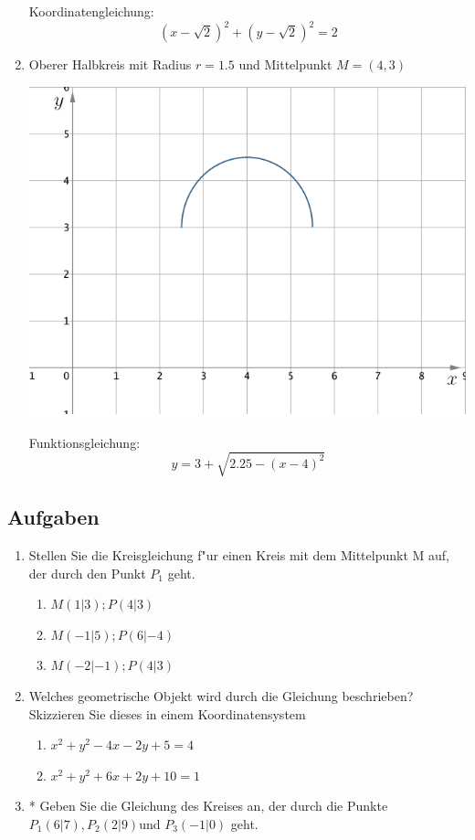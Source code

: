 \begin{enumerate}
Koordinatengleichung:
\[(x - \sqrt 2)^2 + (y - \sqrt 2)^2 = 2 \]


\item Oberer Halbkreis mit Radius $r = 1.5$ und Mittelpunkt $M = (4 , 3)$

\begin{center}
\includegraphics[scale=0.2]{img/kreis/kreis3.png}
\end{center}
Funktionsgleichung: 
\[y = 3 + \sqrt{ 2.25 - (x - 4)^2} \]

\end{enumerate}

\subsection{Aufgaben}
\begin{enumerate}
\item Stellen Sie die Kreisgleichung f"ur einen Kreis mit dem Mittelpunkt M auf, der durch den Punkt $P_1$ geht.
\begin{enumerate}
\item $M(1|3) ; P(4|3)$
\item $M(-1| 5) ; P(6|-4)$
\item $M(-2|-1) ; P(4|3)$
\end{enumerate}
\item Welches geometrische Objekt wird durch die Gleichung beschrieben? Skizzieren Sie dieses in einem Koordinatensystem
\begin{enumerate}
\item $x^2 + y^2 - 4x - 2y + 5 = 4$
\item $x^2 + y^2 + 6x + 2y + 10 = 1$
\end{enumerate}

\item * Geben Sie die Gleichung des Kreises an, der durch die Punkte $P_1(6|7), P_2(2|9) $und $P_3(-1|0)$ geht.

\end{enumerate}

